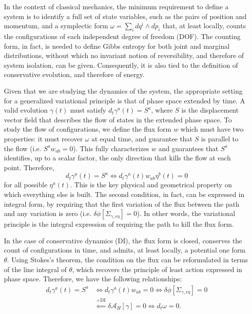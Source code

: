 \documentclass[12pt]{article}
\begin{document}
In the context of classical mechanics, the minimum requirement to define a system is to identify a full set of state variables, such as the pairs of position and momentum, and a symplectic form $\omega = \sum_i dq^i \wedge dp_i$ that, at least locally, counts the configurations of each independent degree of freedom (DOF). The counting form, in fact, is needed to define Gibbs entropy for both joint and marginal distributions, without which no invariant notion of reversibility, and therefore of system isolation, can be given. Consequently, it is also tied to the definition of conservative evolution, and therefore of energy.

Given that we are studying the dynamics of the system, the appropriate setting for a generalized variational principle is that of phase space extended by time. A valid evolution $\gamma(t)$ must satisfy $d_t \gamma^a(t) = S^a$, where $S$ is the displacement vector field that describes the flow of states in the extended phase space. To study the flow of configurations, we define the flux form $w$ which must have two properties: it must recover $\omega$ at equal time, and guarantee that $S$ is parallel to the flow (i.e. $S^a w_{ab} = 0$). This fully characterizes $w$ and guarantees that $S^a$ identifies, up to a scalar factor, the only direction that kills the flow at each point. Therefore,  $$d_t \gamma^a(t) = S^a \iff d_t \gamma^a(t) w_{ab} \eta^b(t)=0$$ for all possible $\eta^a(t)$. This is the key physical and geometrical property on which everything else is built. The second condition, in fact, can be expressed in integral form, by requiring that the first variation of the flux between the path and any variation is zero (i.e. $\delta \phi[\Sigma_{\gamma, \epsilon \eta}]=0$).  In other words, the variational principle is the integral expression of requiring the path to kill the flux form.

In the case of conservative dynamics (DI), the flux form is closed, conserves the count of configurations in time, and admits, at least locally, a potential one form $\theta$. Using Stokes's theorem, the condition on the flux can be reformulated in terms of the line integral of $\theta$, which recovers the principle of least action expressed in phase space. Therefore, we have the following relationships:
\begin{equation}
	\begin{aligned}
		d_t \gamma^a(t) = S^a &\iff d_t \gamma^a(t) w_{ab}=0 \iff \delta \phi[\Sigma_{\gamma, \epsilon \eta}]=0 \\&\stackrel{\text{+DI}}{\impliedby} \delta \mathcal{A}_H[\gamma] = 0 \iff d_t \omega =0.
	\end{aligned}
\end{equation}
\end{document}
